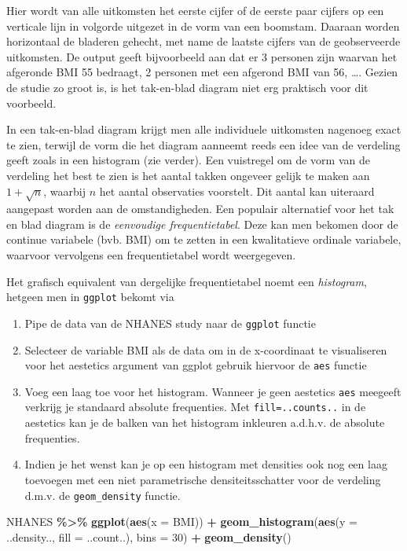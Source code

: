 \documentclass[
  12pt,dutch,coursenotes]{book}
\newenvironment{Shaded}{\begin{snugshade}}{\end{snugshade}}
\newcommand{\DataTypeTok}[1]{\textcolor[rgb]{0.13,0.29,0.53}{#1}}
\newcommand{\DecValTok}[1]{\textcolor[rgb]{0.00,0.00,0.81}{#1}}
\newcommand{\KeywordTok}[1]{\textcolor[rgb]{0.13,0.29,0.53}{\textbf{#1}}}
\newcommand{\NormalTok}[1]{#1}
\newcommand{\OperatorTok}[1]{\textcolor[rgb]{0.81,0.36,0.00}{\textbf{#1}}}
\newcommand{\StringTok}[1]{\textcolor[rgb]{0.31,0.60,0.02}{#1}}
\providecommand{\tightlist}{%
  \setlength{\itemsep}{0pt}\setlength{\parskip}{0pt}}
\theoremstyle{definition}
\theoremstyle{definition}
\theoremstyle{definition}
\theoremstyle{remark}
\begin{document}
Hier wordt van alle uitkomsten het eerste cijfer of de eerste paar cijfers
op een verticale lijn in volgorde uitgezet in de vorm van een boomstam.
Daaraan worden horizontaal de bladeren gehecht, met name de laatste cijfers
van de geobserveerde uitkomsten. De output geeft bijvoorbeeld aan dat er 3 personen zijn waarvan het afgeronde BMI 55 bedraagt, 2 personen met een afgerond BMI van 56, \ldots.
Gezien de studie zo groot is, is het tak-en-blad diagram niet erg praktisch voor dit voorbeeld.

In een tak-en-blad diagram krijgt men alle individuele uitkomsten nagenoeg
exact te zien, terwijl de vorm die het diagram aanneemt reeds een idee van
de verdeling geeft zoals in een histogram (zie verder). Een vuistregel om de
vorm van de verdeling het best te zien is het aantal takken ongeveer gelijk
te maken aan \(1 + \sqrt{n}\), waarbij \(n\) het aantal observaties voorstelt.
Dit aantal kan uiteraard aangepast worden aan de omstandigheden.
Een populair alternatief voor het tak en blad diagram is de \emph{eenvoudige frequentietabel}. Deze kan men bekomen door de continue variabele (bvb. BMI) om te zetten in een kwalitatieve ordinale variabele, waarvoor vervolgens een frequentietabel wordt weergegeven.

Het grafisch equivalent van dergelijke frequentietabel noemt een \emph{histogram}, hetgeen men in \texttt{ggplot} bekomt via

\begin{enumerate}
\def\labelenumi{\arabic{enumi}.}
\tightlist
\item
  Pipe de data van de NHANES study naar de \texttt{ggplot} functie
\item
  Selecteer de variable BMI als de data om in de x-coordinaat te visualiseren voor het aestetics argument van ggplot gebruik hiervoor de \texttt{aes} functie
\item
  Voeg een laag toe voor het histogram. Wanneer je geen aestetics \texttt{aes} meegeeft verkrijg je standaard absolute frequenties. Met \texttt{fill=..counts..} in de aestetics kan je de balken van het histogram inkleuren a.d.h.v. de absolute frequenties.
\item
  Indien je het wenst kan je op een histogram met densities ook nog een laag toevoegen met een niet parametrische densiteitsschatter voor de verdeling d.m.v. de \texttt{geom\_density} functie.
\end{enumerate}

\begin{Shaded}
\begin{Highlighting}[]
\NormalTok{NHANES }\OperatorTok{\%\textgreater{}\%}\StringTok{ }\KeywordTok{ggplot}\NormalTok{(}\KeywordTok{aes}\NormalTok{(}\DataTypeTok{x =}\NormalTok{ BMI)) }\OperatorTok{+}\StringTok{ }\KeywordTok{geom\_histogram}\NormalTok{(}\KeywordTok{aes}\NormalTok{(}\DataTypeTok{y =}\NormalTok{ ..density.., }
    \DataTypeTok{fill =}\NormalTok{ ..count..), }\DataTypeTok{bins =} \DecValTok{30}\NormalTok{) }\OperatorTok{+}\StringTok{ }\KeywordTok{geom\_density}\NormalTok{()}
\end{Highlighting}
\end{Shaded}
\end{document}
